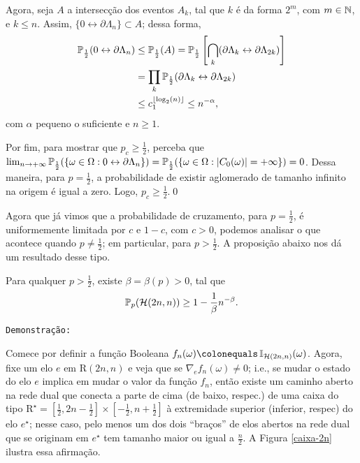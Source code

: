 \par Agora, seja $A$ a intersecção dos eventos $A_k$, tal que $k$ é da forma $2^m$, com $m \in \operatorname{\mathbb{N}}$, e $k \leq n$. Assim, $\{0 \leftrightarrow \partial\Lambda_n\} \subset A$; dessa forma,
\begin{align*}
\operatorname{\mathbb{P}}_{\frac{1}{2}}(0 \leftrightarrow \partial\Lambda_n) &\leq \operatorname{\mathbb{P}}_{\frac{1}{2}}(A) = \operatorname{\mathbb{P}}_{\frac{1}{2}}\left[\bigcap_{k}(\partial\Lambda_k \leftrightarrow \partial\Lambda_{2k})\right] \\
													   &= \prod_{k}\operatorname{\mathbb{P}}_{\frac{1}{2}}(\partial\Lambda_k \leftrightarrow \partial\Lambda_{2k}) \\
													   &\leq c_1^{\lfloor\log_2(n)\rfloor} \leq n^{-\alpha},
\end{align*}
com $\alpha$ pequeno o suficiente e $n \geq 1$.

\par Por fim, para mostrar que $p_c \geq \frac{1}{2}$, perceba que $\lim_{n\to+\infty}\operatorname{\mathbb{P}}_{\frac{1}{2}}(\{\omega \in \Omega : 0 \leftrightarrow \partial\Lambda_n\}) = \operatorname{\mathbb{P}}_{\frac{1}{2}}(\{\omega \in \Omega : |C_0(\omega)| = +\infty\}) = 0$. Dessa maneira, para $p = \frac{1}{2}$, a probabilidade de existir aglomerado de tamanho infinito na origem é igual a zero. Logo, $p_c \geq \frac{1}{2}$.\hspace{\fill}\qed

\par Agora que já vimos que a probabilidade de cruzamento, para $p = \frac{1}{2}$, é uniformemente limitada por $c$ e $1 - c$, com $c > 0$, podemos analisar o que acontece quando $p \neq \frac{1}{2}$; em particular, para $p > \frac{1}{2}$. A proposição abaixo nos dá um resultado desse tipo.

\begin{mypro}\label{prop-beta}
	Para qualquer $p > \frac{1}{2}$, existe $\beta = \beta(p) > 0$, tal que 
	\begin{align*}
		\operatorname{\mathbb{P}}_p(\operatorname{\mathcal{H}}(2n, n)) \geq 1 - \frac{1}{\beta}n^{-\beta}.
	\end{align*}
\end{mypro}

\par \texttt{Demonstração:}

\par Comece por definir a função Booleana $f_n(\omega) \colonequals \IX_{\HL(2n, n)}(\omega)$. Agora, fixe um elo $e$ em $\text{R}(2n, n)$ e veja que se $\nabla_{e}f_n(\omega) \neq 0$; i.e., se mudar o estado do elo $e$ implica em mudar o valor da função $f_n$, então existe um caminho aberto na rede dual que conecta a parte de cima (de baixo, respec.) de uma caixa do tipo $\text{R}^{\star} = \left[\frac{1}{2}, 2n - \frac{1}{2}\right] \times [-\frac{1}{2}, n + \frac{1}{2}]$ à extremidade superior (inferior, respec) do elo $e^{\star}$; nesse caso, pelo menos um dos dois ``braços'' de elos abertos na rede dual que se originam em $e^{\star}$ tem tamanho maior ou igual a $\frac{n}{2}$. A Figura \ref{caixa-2n} ilustra essa afirmação.

